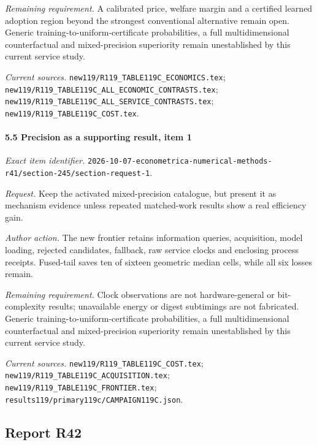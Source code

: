 \par\emph{Remaining requirement.} A calibrated price, welfare margin and a certified learned adoption region beyond the strongest conventional alternative remain open. Generic training-to-uniform-certificate probabilities, a full multidimensional counterfactual and mixed-precision superiority remain unestablished by this current service study.

\par\emph{Current sources.} \nolinkurl{new119/R119_TABLE119C_ECONOMICS.tex}; \nolinkurl{new119/R119_TABLE119C_ALL_ECONOMIC_CONTRASTS.tex}; \nolinkurl{new119/R119_TABLE119C_ALL_SERVICE_CONTRASTS.tex}; \nolinkurl{new119/R119_TABLE119C_COST.tex}.

\paragraph{5.5 Precision as a supporting result, item 1}

\emph{Exact item identifier.} \nolinkurl{2026-10-07-econometrica-numerical-methods-r41/section-245/section-request-1}.

\par\emph{Request.} Keep the activated mixed-precision catalogue, but present it as mechanism evidence unless repeated matched-work results show a real efficiency gain.

\par\emph{Author action.} The new frontier retains information queries, acquisition, model loading, rejected candidates, fallback, raw service clocks and enclosing process receipts. Fused-tail saves ten of sixteen geometric median cells, while all six losses remain.

\par\emph{Remaining requirement.} Clock observations are not hardware-general or bit-complexity results; unavailable energy or digest subtimings are not fabricated. Generic training-to-uniform-certificate probabilities, a full multidimensional counterfactual and mixed-precision superiority remain unestablished by this current service study.

\par\emph{Current sources.} \nolinkurl{new119/R119_TABLE119C_COST.tex}; \nolinkurl{new119/R119_TABLE119C_ACQUISITION.tex}; \nolinkurl{new119/R119_TABLE119C_FRONTIER.tex}; \nolinkurl{results119/primary119c/CAMPAIGN119C.json}.

\subsection{Report R42}

